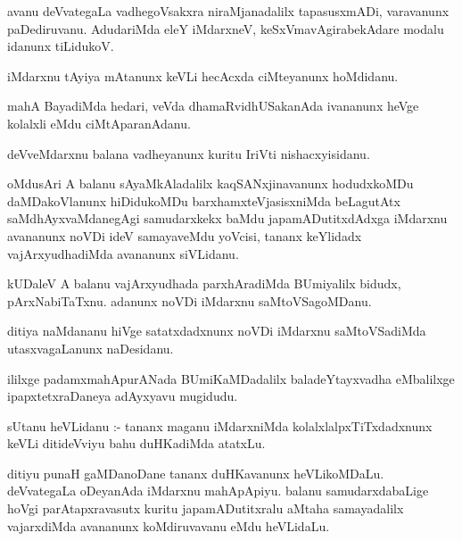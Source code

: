 \documentclass{article}
\begin{document}
\begin{mn}
avanu deVvategaLa vadhegoVsakxra niraMjanadalilx tapasusxmADi, varavanunx 
paDediruvanu. AdudariMda eleY iMdarxneV, keSxVmavAgirabekAdare modalu idanunx tiLidukoV.
\end{mn}

\begin{mn}
iMdarxnu tAyiya mAtanunx keVLi hecAcxda ciMteyanunx hoMdidanu.
\end{mn}

\begin{mn}
mahA BayadiMda hedari, veVda dhamaRvidhUSakanAda ivananunx heVge kolalxli eMdu ciMtAparanAdanu. 
\end{mn}

\begin{mn}
deVveMdarxnu balana vadheyanunx kuritu IriVti nishacxyisidanu.
\end{mn}

\begin{mn}
oMdusAri  A balanu sAyaMkAladalilx kaqSANxjinavanunx  hodudxkoMDu  
daMDakoVlanunx  hiDidukoMDu barxhamxteVjasisxniMda beLagutAtx saMdhAyxvaMdanegAgi 
samudarxkekx baMdu japamADutitxdAdxga iMdarxnu avananunx noVDi ideV 
samayaveMdu yoVcisi, tananx keYlidadx vajArxyudhadiMda avananunx siVLidanu. 
\end{mn}

\begin{mn}
kUDaleV A balanu vajArxyudhada parxhAradiMda BUmiyalilx bidudx, pArxNabiTaTxnu. 
adanunx noVDi iMdarxnu saMtoVSagoMDanu.
\end{mn}

\begin{mn}
ditiya naMdananu hiVge satatxdadxnunx noVDi iMdarxnu saMtoVSadiMda utasxvagaLanunx naDesidanu.
\end{mn}

\begin{mn}
ililxge padamxmahApurANada BUmiKaMDadalilx baladeYtayxvadha eMbalilxge ipapxtetxraDaneya adAyxyavu mugidudu.
\end{mn}




\begin{mn}
sUtanu heVLidanu :- tananx maganu iMdarxniMda kolalxlalpxTiTxdadxnunx keVLi 
ditideVviyu bahu duHKadiMda atatxLu. 
\end{mn}

\begin{mn}
ditiyu punaH gaMDanoDane tananx duHKavanunx heVLikoMDaLu. deVvategaLa oDeyanAda 
iMdarxnu mahApApiyu.  balanu samudarxdabaLige hoVgi parAtapxravasutx kuritu 
japamADutitxralu aMtaha samayadalilx vajarxdiMda avananunx koMdiruvavanu eMdu heVLidaLu.
\end{mn}
\end{document}
